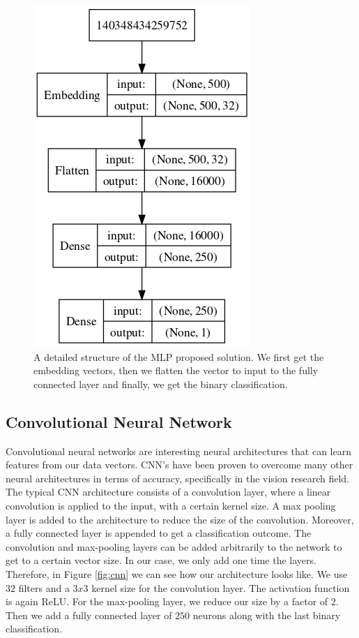 \documentclass[conference]{IEEEtran}
\theoremstyle{plain}
\theoremstyle{definition}
\theoremstyle{remark}
\begin{document}
\begin{figure}[tbh!]
	\centering
	\includegraphics[width=.4\linewidth]{model_MLP.png}
	\caption[bla.]{A detailed structure of the MLP proposed solution. We first get the embedding vectors, then we flatten the vector to input to the fully connected layer and finally, we get the binary classification.}
	\label{fig:mlp}
\end{figure}


\subsection{Convolutional Neural Network}
Convolutional neural networks are interesting neural architectures that can learn features from our data vectors. CNN's have been proven to overcome many other neural architectures in terms of accuracy, specifically in the vision research field. The typical CNN architecture consists of a convolution layer, where a linear convolution is applied to the input, with a certain kernel size. A max pooling layer is added to the architecture to reduce the size of the convolution. Moreover, a fully connected layer is appended to get a classification outcome. The convolution and max-pooling layers can be added arbitrarily to the network to get to a certain vector size. In our case, we only add one time the layers. Therefore, in Figure \ref{fig:cnn} we can see how our architecture looks like.  We use $32$ filters and a $3x3$ kernel size for the convolution layer. The activation function is again ReLU. For the max-pooling layer, we reduce our size by a factor of $2$. Then we add a fully connected layer of $250$ neurons along with the last binary classification.
\end{document}
